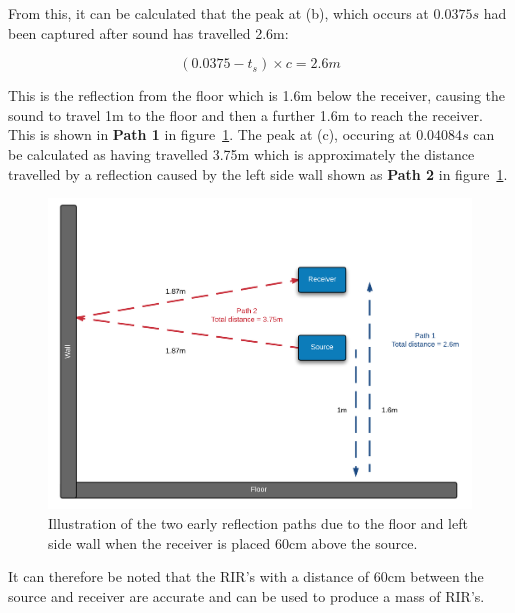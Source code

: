 \documentclass[../../main.tex]{subfiles}
\begin{document}
			From this, it can be calculated that the peak at (b), which occurs at $0.0375s$ had been captured after sound has travelled 2.6m:

			\begin{equation}
			(0.0375 - t_s)\times{c} = 2.6m
			\end{equation}

			This is the reflection from the floor which is 1.6m below the receiver, causing the sound to travel 1m to the floor and then a further 1.6m to reach the receiver. This is shown in \textbf{Path 1} in figure~\ref{reflectionPaths}. The peak at (c), occuring at $0.04084s$ can be calculated as having travelled 3.75m which is approximately the distance travelled by a reflection caused by the left side wall shown as \textbf{Path 2} in figure~\ref{reflectionPaths}.

			\begin{figure}[H]
			\centerline{\includegraphics[scale = 0.25]{Sections/Implementation/Odeon/images/incorrectRIR/reflectionPaths_colourV1.png}}
				\caption{Illustration of the two early reflection paths due to the floor and left side wall when the receiver is placed 60cm above the source.}
				\label{reflectionPaths}
			\end{figure}

			It can therefore be noted that the \ac{RIR}'s with a distance of 60cm between the source and receiver are accurate and can be used to produce a mass of \ac{RIR}'s.
\end{document}

